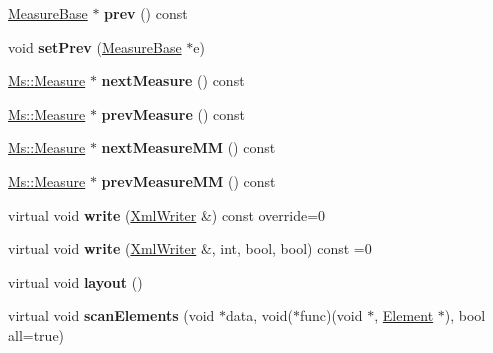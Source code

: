 \begin{DoxyCompactItemize}
\hyperlink{class_ms_1_1_measure_base}{Measure\+Base} $\ast$ {\bfseries prev} () const
\item 
\mbox{\label{class_ms_1_1_measure_base_a5a6ecdc9edbbef845313a1048311dc40}} 
void {\bfseries set\+Prev} (\hyperlink{class_ms_1_1_measure_base}{Measure\+Base} $\ast$e)
\item 
\mbox{\label{class_ms_1_1_measure_base_aedd64e3c953d01bf113ff058acc85c33}} 
\hyperlink{class_ms_1_1_measure}{Ms\+::\+Measure} $\ast$ {\bfseries next\+Measure} () const
\item 
\mbox{\label{class_ms_1_1_measure_base_a1e7c48a9b7d820727aa6671d5674245c}} 
\hyperlink{class_ms_1_1_measure}{Ms\+::\+Measure} $\ast$ {\bfseries prev\+Measure} () const
\item 
\mbox{\label{class_ms_1_1_measure_base_a465526b0763cb2115717ea69f9d2138b}} 
\hyperlink{class_ms_1_1_measure}{Ms\+::\+Measure} $\ast$ {\bfseries next\+Measure\+MM} () const
\item 
\mbox{\label{class_ms_1_1_measure_base_acbf43cdf7374acdb0f18e56784d704f2}} 
\hyperlink{class_ms_1_1_measure}{Ms\+::\+Measure} $\ast$ {\bfseries prev\+Measure\+MM} () const
\item 
\mbox{\label{class_ms_1_1_measure_base_af6b62ee81c234c69450036dc1c78f467}} 
virtual void {\bfseries write} (\hyperlink{class_ms_1_1_xml_writer}{Xml\+Writer} \&) const override=0
\item 
\mbox{\label{class_ms_1_1_measure_base_adc34f93f24a935c975e1e082b32c67fb}} 
virtual void {\bfseries write} (\hyperlink{class_ms_1_1_xml_writer}{Xml\+Writer} \&, int, bool, bool) const =0
\item 
\mbox{\label{class_ms_1_1_measure_base_a315fd9e36f1c61d488a1b1a753d9c31b}} 
virtual void {\bfseries layout} ()
\item 
\mbox{\label{class_ms_1_1_measure_base_a60225d885a19cc554e0d1f74dd3085e7}} 
virtual void {\bfseries scan\+Elements} (void $\ast$data, void($\ast$func)(void $\ast$, \hyperlink{class_ms_1_1_element}{Element} $\ast$), bool all=true)

\end{DoxyCompactItemize}
